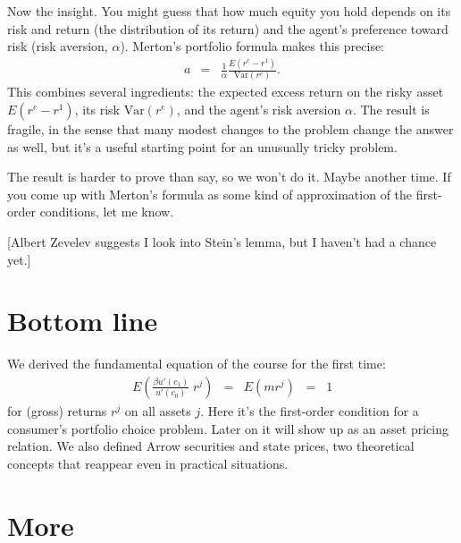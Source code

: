 \documentclass[11pt]{article}
\begin{document}
Now the insight.  You might guess that how much equity you hold
depends on its risk and return (the distribution of its return)
and the agent's preference toward risk (risk aversion, $\alpha$).
Merton's portfolio formula makes this precise:
\begin{eqnarray*}
    a &=& \frac{1}{\alpha} \frac{E (r^e - r^1)}{\mbox{Var}(r^e)} .
\end{eqnarray*}
This combines several ingredients:
the expected excess return on the risky asset $E (r^e - r^1)$,
its risk $\mbox{Var}(r^e)$,
and the agent's risk aversion $\alpha$.
The result is fragile, in the sense that many modest changes to the problem
change the answer as well,
but it's a useful starting point for an unusually tricky problem.

The result is harder to prove than say, so we won't do it.
Maybe another time.
If you come up with Merton's formula as some kind of approximation
of the first-order conditions, let me know.

[Albert Zevelev suggests I look into Stein's lemma, but I haven't
had a chance yet.]

\begin{comment}
Merton derived it in continuous time using a set of tools
we will diligently avoid.
Here we might start with the lognormal assumption.
Let us say that $x = \log r^e - \log r^1 \sim \mathcal{N}(\kappa_1,\kappa_2)$.
Then $r^e = r^1 e^x$ and
$r^e-r^1 = r^1 (e^x-1)$.
\end{comment}


\section*{Bottom line}

We derived the fundamental equation of the course for the first time:
\begin{eqnarray*}
    E \left( \frac{\beta u'(c_1)}{u'(c_0)}\; r^j \right) &=&
        E \left( m r^j \right) \;\;=\;\;  1
\end{eqnarray*}
for (gross) returns $r^j$ on all assets $j$.
Here it's the first-order condition for a consumer's portfolio choice
problem.
Later on it will show up as an asset pricing relation.
We also defined Arrow securities and state prices,
two theoretical concepts that reappear even in practical
situations.

\section*{More}
\end{document}
